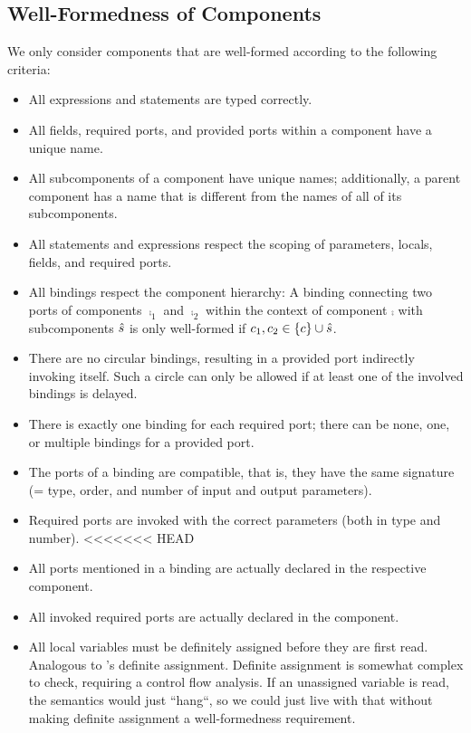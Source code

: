 \documentclass[a4paper,10pt,english]{article}
\begin{document}
\subsection{Well-Formedness of Components}
We only consider components that are well-formed according to the following criteria:
\begin{itemize}
	\item All expressions and statements are typed correctly.
	\item All fields, required ports, and provided ports within a component have a unique name.
	\item All subcomponents of a component have unique names; additionally, a parent component has a name that is different from the
	names of all of its subcomponents.
	\item All statements and expressions respect the scoping of parameters, locals, fields, and required ports.
	\item All bindings respect the component hierarchy: A binding connecting two ports of components $\comp_1$ and $\comp_2$ within
	the context of component $\comp$ with subcomponents $\hat{s}$ is only well-formed if $c_1, c_2 \in \{ c \} \cup
	\hat{s}$.
	\item There are no circular bindings, resulting in a provided port indirectly invoking itself. Such a circle can only be allowed
	if at least one of the involved bindings is delayed.
	\item There is exactly one binding for each required port; there can be none, one, or multiple bindings for a provided port.
	\item The ports of a binding are compatible, that is, they have the same signature (= type, order, and number of input and
	output parameters).
	\item Required ports are invoked with the correct parameters (both in type and number).
<<<<<<< HEAD
	\item All ports mentioned in a binding are actually declared in the respective component.
	\item All invoked required ports are actually declared in the component.
	\item All local variables must be definitely assigned before they are first read. Analogous to \CSharp's definite assignment.
	Definite assignment is somewhat complex to check, requiring a control flow analysis. If an unassigned variable is read, the
	semantics would just ``hang``, so we could just live with that without making definite assignment a well-formedness requirement.

\end{itemize}
\end{document}
